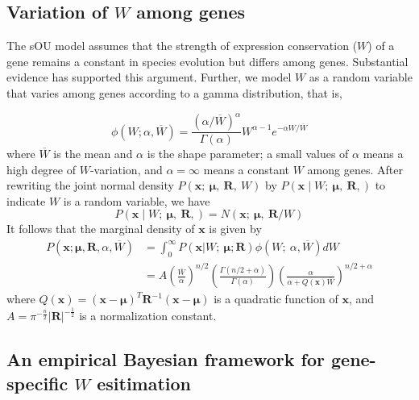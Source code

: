 \documentclass[]{book}
\begin{document}
\hypertarget{variation-of-w-among-genes}{%
\subsection{\texorpdfstring{Variation of \(W\) among genes}{Variation of W among genes}}\label{variation-of-w-among-genes}}

The sOU model assumes that the strength of expression conservation (\(W\)) of a gene remains a constant in species evolution but differs among genes. Substantial evidence has supported this argument\citep[\citet{brawand2011}\citet{cui2007}\citet{park2013}\citet{tirosh2006}\citet{warnefors2012}\citet{zou2011}]{bedford2009}. Further, we model \(W\) as a random variable that varies among genes according to a gamma distribution, that is,

\[\phi\left(W;\alpha,\overline{W}\right)=\frac{(\alpha/\overline{W})^\alpha}{\Gamma\left(\alpha\right)}W^{\alpha-1}e^{-\alpha W/\overline{W}}\tag{3.4}\]
where \(\overline{W}\) is the mean and \(\alpha\) is the shape parameter; a small values of \(\alpha\) means a high degree of \(W\)-variation, and \(\alpha = \infty\) means a constant \(W\) among genes. After rewriting the joint normal density \(P\left(\boldsymbol{x};\  \boldsymbol{\mu},\  \boldsymbol{R},\  W\right)\) by \(P\left(\boldsymbol{x}\mid W;\  \boldsymbol{\mu},\  \boldsymbol{R},\right)\) to indicate \(W\) is a random variable, we have
\[P\left(\boldsymbol{x}\mid W;\  \boldsymbol{\mu},\  \boldsymbol{R},\right)=N\left(\boldsymbol{x};\  \boldsymbol{\mu},\  \boldsymbol{R}/W\right)\tag{3.5}\]
It follows that the marginal density of \(\boldsymbol{x}\) is given by
\[
\begin{split}
P\left(\boldsymbol{x};\boldsymbol{\mu},\boldsymbol{R},\alpha,\overline{W}\right)&=\int_0^{\infty}P\left(\boldsymbol{x}|W;\  \boldsymbol{\mu};\boldsymbol{R}\right)\phi\left(W;\  \alpha,\overline{W}\right)dW\\
&=A\left(\frac{\overline{W}}{\alpha}\right)^{n/2}\left(\frac{\Gamma\left(n/2+\alpha\right)}{\Gamma\left(\alpha\right)}\right)\left(\frac{\alpha}{\alpha+Q\left(\boldsymbol{x}\right)\overline{W}}\right)^{n/2+\alpha}
\end{split}\tag{3.6}
\]
where \(Q\left(\boldsymbol{x}\right)=\left(\boldsymbol{x}-\boldsymbol{\mu}\right)^T\boldsymbol{R}^{-1}\left(\boldsymbol{x}-\boldsymbol{\mu}\right)\) is a quadratic function of \(\boldsymbol{x}\), and \(A=\pi^{-\frac{n}{2}}\left|\boldsymbol{R}\right|^{-\frac{1}{2}}\) is a normalization constant.

\hypertarget{an-empirical-bayesian-framework-for-gene-specific-w-esitimation}{%
\subsection{\texorpdfstring{An empirical Bayesian framework for gene-specific \(W\) esitimation}{An empirical Bayesian framework for gene-specific W esitimation}}\label{an-empirical-bayesian-framework-for-gene-specific-w-esitimation}}
\end{document}

